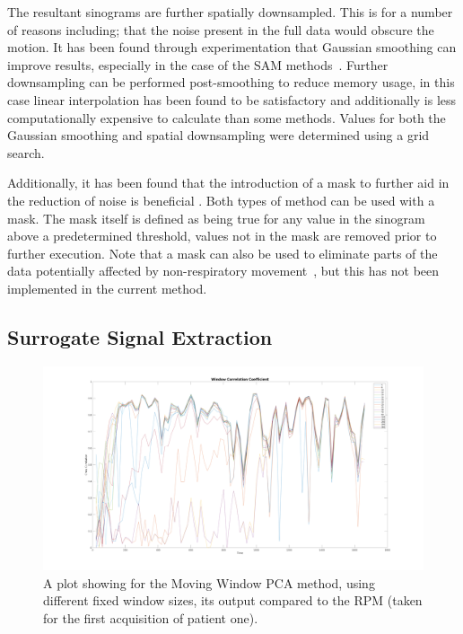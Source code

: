        The resultant sinograms are further spatially downsampled. This is for a number of reasons including; that the noise present in the full data would obscure the motion. It has been found through experimentation that Gaussian smoothing can improve results, especially in the case of the \gls{SAM} methods~\cite{Thielemans2013ComparisonData}. Further downsampling can be performed post-smoothing to reduce memory usage, in this case linear interpolation has been found to be satisfactory and additionally is less computationally expensive to calculate than some methods. Values for both the Gaussian smoothing and spatial downsampling were determined using a grid search.
        
        Additionally, it has been found that the introduction of a mask to further aid in the reduction of noise is beneficial \cite{Thielemans2011}. Both types of method can be used with a mask. The mask itself is defined as being true for any value in the sinogram above a predetermined threshold, values not in the mask are removed prior to further execution. Note that a mask can also be used to eliminate parts of the data potentially affected by non-respiratory movement~\cite{Bertolli2018Data-DrivenTomography}, but this has not been implemented in the current method.
    
        
    \subsection{Surrogate Signal Extraction} \label{sec:surrogate_signal_extraction}
        \begin{figure}
            \centering
        
            \includegraphics[width=1.0\linewidth]{figures/pca_window_correlation_coefficient.png}
        
            \captionsetup{singlelinecheck=false, justification=centering}
            \caption{A plot showing for the Moving Window \gls{PCA} method, using different fixed window sizes, its output compared to the \gls{RPM} (taken for the first acquisition of patient one).}
            \label{fig:pca_window_correlation_coefficient}
        \end{figure}
        
